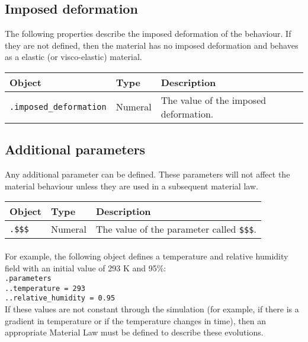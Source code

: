 \documentclass[10pt]{article}
\begin{document}
\subsection{Imposed deformation}

The following properties describe the imposed deformation of the behaviour. If they are not defined, then the material has no imposed deformation and behaves as a elastic (or visco-elastic) material.\\

\begin{tabularx}{\textwidth}{llX}
\hline 
Object & Type & Description \\ 
\hline 
\verb+.imposed_deformation+ & Numeral & The value of the imposed deformation.\\
\hline 
\end{tabularx}

\subsection{Additional parameters}

Any additional parameter can be defined. These parameters will not affect the material behaviour unless they are used in a subsequent material law.\\

\begin{tabularx}{\textwidth}{llX}
\hline 
Object & Type & Description \\ 
\hline 
\verb+.$$$+ & Numeral & The value of the parameter called \verb+$$$+.\\
\hline 
\end{tabularx}

\paragraph{} For example, the following object defines a temperature and relative humidity field with an initial value of 293 K and 95\%:\\
\verb+.parameters+\\
\verb+..temperature = 293+\\
\verb+..relative_humidity = 0.95+\\

If these values are not constant through the simulation (for example, if there is a gradient in temperature or if the temperature changes in time), then an appropriate Material Law must be defined to describe these evolutions.
\end{document}
